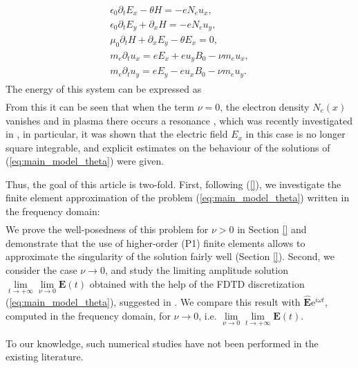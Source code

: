 \begin{align}
\label{eq:main_model_theta}
\begin{split}
\epsilon_0\partial_t E_{x}-\theta H=-eN_e u_x,\nonumber\\
\epsilon_0\partial_t E_{y}+\partial_x H=-eN_e u_y,\nonumber\\
\mu_0\partial_t H+\partial_x E_y-\theta E_x=0,\\
m_e\partial_t u_x=eE_x+eu_yB_0-\nu m_e u_x,\nonumber\\
m_e\partial_t u_y=eE_y-eu_xB_0-\nu m_e u_y.
\end{split}
\end{align}
The energy of this system can be expressed as \cite{}
\begin{align*}
 
\end{align*}
From this it can be seen that when the term $\nu=0$, the electron density $N_e(x)$ vanishes and in plasma there occurs a resonance \cite{Stix}, 
which was recently investigated in \cite{}, in particular, it was shown that the electric field $E_x$ in this case is no longer square 
integrable, and explicit estimates on the behaviour of the solutions of (\ref{eq:main_model_theta}) were given. 

Thus, the goal of this article is two-fold. 
First, following (\ref{}), we investigate the finite element approximation of the 
problem (\ref{eq:main_model_theta}) written in the frequency domain:
\begin{align*}
 
\end{align*}
We prove the well-posedness of this problem for $\nu>0$ in Section \ref{} and 
demonstrate that the use of higher-order (P1) finite elements allows to approximate the singularity of the solution fairly well (Section \ref{}). 
Second, we consider the case $\nu\rightarrow 0$, and study the limiting amplitude solution 
$\lim\limits_{t\rightarrow +\infty}\lim\limits_{\nu\rightarrow 0}\mathbf{E}(t)$ obtained with the help of 
the FDTD discretization (\ref{eq:main_model_theta}), suggested in \cite{}. We compare this result with 
$\hat{\mathbf{E}}\mathrm{e}^{i\omega t}$, computed in the frequency domain, for $\nu\rightarrow 0$, i.e.
$\lim\limits_{\nu\rightarrow 0}\lim\limits_{t\rightarrow+\infty}\mathbf{E}(t)$.

To our knowledge, such numerical studies have not been performed in the existing literature. 





